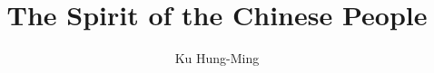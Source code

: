\documentclass[adobefonts]{ctexbook}
\newcommand{\doctitle}{The Spirit of the Chinese People}
\newcommand{\docauthor}{Ku Hung-Ming} %
\newcommand{\docsubject}{}
\newcommand{\doctitle}{春秋大義}
\newcommand{\docauthor}{辜鴻銘}
\newcommand{\docsubject}{中國人的精神}
\begin{document}
\author{\docauthor}
\title{\doctitle}
\maketitle


\frontmatter%





\tableofcontents



\mainmatter%

















\appendix







\backmatter%

\printindex

\end{document}
